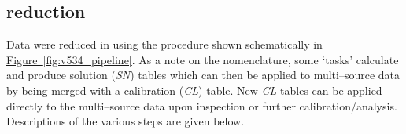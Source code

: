     \subsection{\textbf{\bf \aips} reduction}
        Data were reduced in \aips using the procedure shown schematically in \hyperref[fig:v534_pipeline]{Figure~\ref*{fig:v534_pipeline}}. %
        As a note on the nomenclature, some \aips\space`tasks' calculate and produce solution ({\it SN}) tables which can then be applied to multi--source data by being merged with a calibration ({\it CL}) table. New {\it CL} tables can be applied directly to the multi--source data upon inspection or further calibration/analysis. Descriptions of the various steps are given below.
